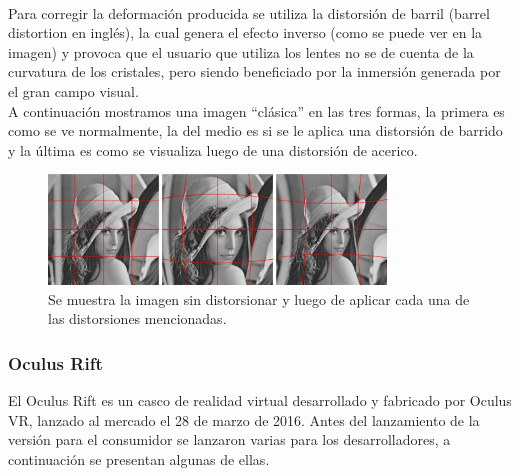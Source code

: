 \documentclass[12pt]{article}
\begin{document}
\\Para corregir la deformación producida se utiliza la distorsión de barril (barrel distortion en inglés), la cual genera el efecto inverso (como se puede ver en la imagen) y provoca que el usuario que utiliza los lentes no se de cuenta de la curvatura de los cristales, pero siendo beneficiado por la inmersión generada por el gran campo visual. 
\\A continuación mostramos una imagen “clásica” en las tres formas, la primera es como se ve normalmente, la del medio es si se le aplica una distorsión de barrido y la última es como se visualiza luego de una distorsión de acerico.
\begin{figure}[h!]
\includegraphics[width=0.8\textwidth, center]{imagen_clasica.png}
\caption{Se muestra la imagen sin distorsionar y luego de aplicar cada una de las distorsiones mencionadas.}
\end{figure}
\clearpage
\subsubsection{ Oculus Rift}
El Oculus Rift es un casco de realidad virtual desarrollado y fabricado por Oculus VR, lanzado al mercado el 28 de marzo de 2016. Antes del lanzamiento de la versión para el consumidor se lanzaron varias para los desarrolladores, a continuación se presentan algunas de ellas.
\end{document}
